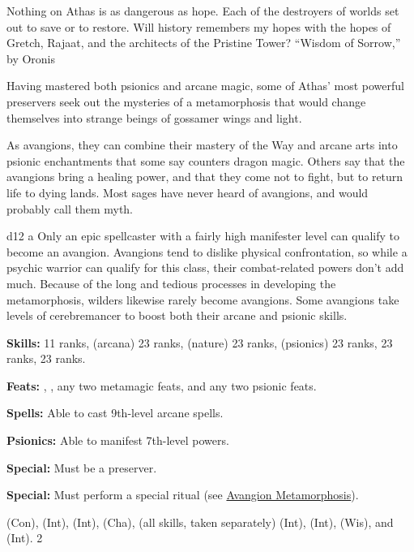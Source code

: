 {Nothing on Athas is as dangerous as hope. Each of the destroyers of worlds set out to save or to restore. Will history remembers my hopes with the hopes of Gretch, Rajaat, and the architects of the Pristine Tower?}
{``Wisdom of Sorrow,'' by Oronis}
{
Having mastered both psionics and arcane magic, some of Athas' most powerful preservers seek out the mysteries of a metamorphosis that would change themselves into strange beings of gossamer wings and light.

As avangions, they can combine their mastery of the Way and arcane arts into psionic enchantments that some say counters dragon magic. Others say that the avangions bring a healing power, and that they come not to fight, but to return life to dying lands. Most sages have never heard of avangions, and would probably call them myth.
}
{d12}
{a}
{
Only an epic spellcaster with a fairly high manifester level can qualify to become an avangion. Avangions tend to dislike physical confrontation, so while a psychic warrior can qualify for this class, their combat-related powers don't add much. Because of the long and tedious processes in developing the metamorphosis, wilders likewise rarely become avangions. Some avangions take levels of cerebremancer to boost both their arcane and psionic skills.
}
{
\textbf{Skills:}  11 ranks,  (arcana) 23 ranks,  (nature) 23 ranks,  (psionics) 23 ranks,  23 ranks,  23 ranks.

\textbf{Feats:} , , any two metamagic feats, and any two psionic feats.

\textbf{Spells:} Able to cast 9th-level arcane spells.

\textbf{Psionics:} Able to manifest 7th-level powers.

\textbf{Special:} Must be a preserver.

\textbf{Special:} Must perform a special ritual (see \hyperref[Avangion Metamorphosis]{Avangion Metamorphosis}).
}
{
 (Con),  (Int),  (Int),  (Cha),  (all skills, taken separately) (Int),  (Int),  (Wis), and  (Int).
}
{2}
{\WarriorTable[ll *{3}{Z{12mm}} L]}
